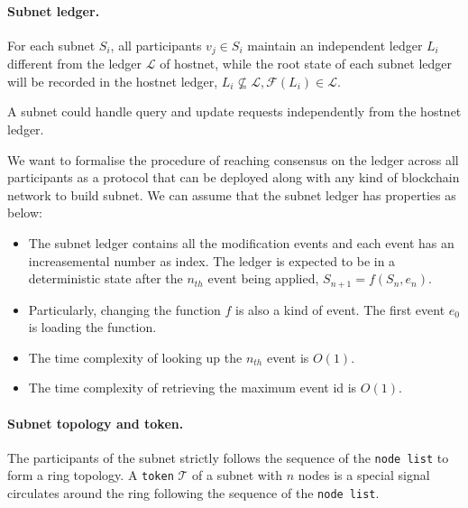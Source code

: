 \documentclass[11pt]{article}
\begin{document}
\paragraph{Subnet ledger.}
For each subnet $S_{i}$, all participants \(v_{j} \in S_{i}\) maintain an independent ledger $L_{i}$ different from the ledger $\mathcal{L}$ of hostnet, while the root state of each subnet ledger will be recorded in the hostnet ledger, \( L_{i} \nsubseteq \mathcal{L}, \mathcal{F}(L_{i}) \in \mathcal{L} \).

A subnet could handle query and update requests independently from the hostnet ledger.

We want to formalise the procedure of reaching consensus on the ledger across all participants as a protocol that can be deployed along with any kind of blockchain network to build subnet. We can assume that the subnet ledger has properties as below:

\begin{itemize}
\item The subnet ledger contains all the modification events and each event has an increasemental number as index.
The ledger is expected to be in a deterministic state after the $n_{th}$ event being applied, \(S_{n+1} = f(S_{n}, e_{n})\).
\item Particularly, changing the function $f$ is also a kind of event. The first event $e_{0}$ is loading the function.
\item The time complexity of looking up the $n_{th}$ event is $O(1)$.
\item The time complexity of retrieving the maximum event id is $O(1)$.
\end{itemize}

\paragraph{Subnet topology and token.}
The participants of the subnet strictly follows the sequence of the \texttt{node list} to form a ring topology.
A \texttt{token} $\mathcal{T}$ of a subnet with $n$ nodes is a special signal circulates around the ring following the sequence of the \texttt{node list}.
\end{document}
